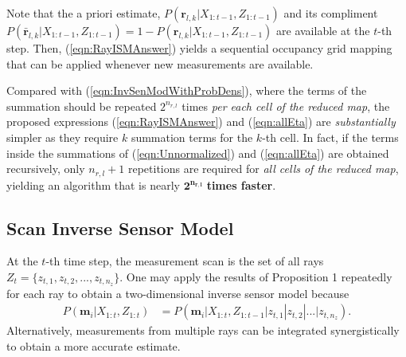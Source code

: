 \documentclass[letterpaper, 10pt, conference]{ieeeconf}
\newcommand{\refeqn}[1]{(\ref{eqn:#1})}
\begin{document}
Note that the a priori estimate, $P(\mathbf{r}_{l,k}|X_{1:t-1},Z_{1:t-1})$ and its compliment $P(\bar{\mathbf{r}}_{l,k}|X_{1:t-1},Z_{1:t-1})=1-P(\mathbf{r}_{l,k}|X_{1:t-1},Z_{1:t-1})$ are available at the $t$-th step. Then, \refeqn{RayISMAnswer} yields a sequential occupancy grid mapping that can be applied whenever new measurements are available. 

Compared with \refeqn{InvSenModWithProbDens}, where the terms of the summation should be repeated $2^{n_{r,l}}$ times \emph{per each cell of the reduced map}, the proposed expressions \refeqn{RayISMAnswer} and \refeqn{allEta} are \textit{substantially} simpler as they require $k$ summation terms for the $k$-th cell. In fact, if the terms inside the summations of \refeqn{Unnormalized} and \refeqn{allEta} are obtained recursively, only $n_{r,l}+1$ repetitions are required for \emph{all cells of the reduced map}, yielding an algorithm that is nearly $\mathbf{2^{n_{r,l}}}$ \textbf{times faster}.


\subsection{Scan Inverse Sensor Model}


At the $t$-th time step, the measurement scan is the set of all rays $Z_t=\{z_{t,1},z_{t,2},...,z_{t,n_z}\}$. One may apply the results of Proposition 1 repeatedly for each ray to obtain a two-dimensional inverse sensor model because
\begin{align}
P(\mathbf{m}_i|X_{1:t},Z_{1:t})&%
=P(\mathbf{m}_i|X_{1:t},Z_{1:t-1}|z_{t,1}|z_{t,2}|...|z_{t,n_z}).
\end{align}
Alternatively, measurements from multiple rays can be integrated synergistically to obtain a more accurate estimate.



\end{document}
